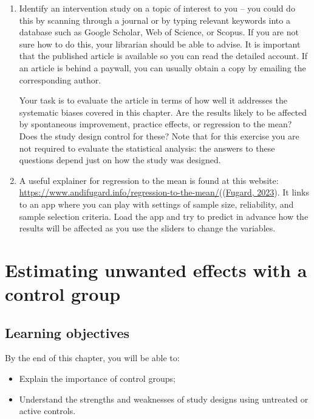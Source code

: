 \documentclass{krantz}
\begin{document}
\begin{enumerate}
\def\labelenumi{\arabic{enumi}.}
\item
  Identify an intervention study on a topic of interest to you -- you could do this by scanning through a journal or by typing relevant keywords into a database such as Google Scholar, Web of Science, or Scopus. If you are not sure how to do this, your librarian should be able to advise. It is important that the published article is available so you can read the detailed account. If an article is behind a paywall, you can usually obtain a copy by emailing the corresponding author.

  Your task is to evaluate the article in terms of how well it addresses the systematic biases covered in this chapter. Are the results likely to be affected by spontaneous improvement, practice effects, or regression to the mean? Does the study design control for these? Note that for this exercise you are not required to evaluate the statistical analysis: the answers to these questions depend just on how the study was designed.
\item
  A useful explainer for regression to the mean is found at this website: \url{https://www.andifugard.info/regression-to-the-mean/}((\protect\hyperlink{ref-fugard2023}{Fugard, 2023}). It links to an app where you can play with settings of sample size, reliability, and sample selection criteria. Load the app and try to predict in advance how the results will be affected as you use the sliders to change the variables.
\end{enumerate}

\hypertarget{controls}{%
\chapter{Estimating unwanted effects with a control group}\label{controls}}

\hypertarget{learning-objectives-5}{%
\section{Learning objectives}\label{learning-objectives-5}}

By the end of this chapter, you will be able to:

\begin{itemize}
\item
  Explain the importance of control groups;
\item
  Understand the strengths and weaknesses of study designs using untreated or active controls.
\end{itemize}
\end{document}
